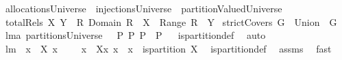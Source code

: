\begin{isabellebody}
\isamarkupfalse%
\ {\isachardoublequoteopen}allocationsUniverse\ {\isacharequal}{\isacharequal}\ injectionsUniverse\ {\isasyminter}\ partitionValuedUniverse{\isachardoublequoteclose}\isanewline
{}\isamarkupfalse%
\ {\isachardoublequoteopen}totalRels\ X\ Y\ {\isacharequal}{\isacharequal}\ {\isacharbraceleft}R{\isachardot}\ Domain\ R\ {\isacharequal}\ X\ {\isacharampersand}\ Range\ R\ {\isasymsubseteq}\ Y{\isacharbraceright}{\isachardoublequoteclose}\isanewline
{}\isamarkupfalse%
\ {\isachardoublequoteopen}strictCovers\ G\ {\isacharequal}{\isacharequal}\ Union\ {\isacharminus}{\isacharbackquote}\ {\isacharbraceleft}G{\isacharbraceright}{\isachardoublequoteclose}%
\isamarkuptrue%
\isamarkupfalse%
\ lm{}{}a{\isacharcolon}\ {\isachardoublequoteopen}partitionsUniverse\ {\isasymsubseteq}\ \ {\isacharbraceleft}P{\isacharminus}{\isacharbraceleft}{\isacharbraceleft}{\isacharbraceright}{\isacharbraceright}{\isacharbar}\ P{\isachardot}\ {\isasymInter}P\ {\isasymin}\ {\isacharbraceleft}{\isasymUnion}P{\isacharcomma}{\isacharbraceleft}{\isacharbraceright}{\isacharbraceright}{\isacharbraceright}{\isachardoublequoteclose}%
\isadelimproof
\ %
\endisadelimproof
%
\isatagproof
{}\isamarkupfalse%
\ is{\isacharunderscore}partition{\isacharunderscore}def\ \isamarkupfalse%
\ auto%
\endisatagproof
{\isafoldproof}%
%
\isadelimproof
%
\endisadelimproof
\isanewline
{}\isamarkupfalse%
\ lm{}{}{\isacharcolon}\ \ {\isachardoublequoteopen}{\isacharbang}x{}\ {\isacharcolon}\ X{\isachardot}\ {\isacharparenleft}x{}\ {\isasymnoteq}\ {\isacharbraceleft}{\isacharbraceright}\ {\isacharampersand}\ {\isacharparenleft}{\isacharbang}\ x{}\ {\isacharcolon}\ X{\isacharminus}{\isacharbraceleft}x{}{\isacharbraceright}{\isachardot}\ x{}\ {\isasyminter}\ x{}{\isacharequal}{\isacharbraceleft}{\isacharbraceright}{\isacharparenright}{\isacharparenright}{\isachardoublequoteclose}\ \ {\isachardoublequoteopen}is{\isacharunderscore}partition\ X{\isachardoublequoteclose}\ \isanewline
%
\isadelimproof
%
\endisadelimproof
%
\isatagproof
{}\isamarkupfalse%
\ is{\isacharunderscore}partition{\isacharunderscore}def\ \isamarkupfalse%
\ assms\ \isamarkupfalse%
\ fast%
\endisatagproof
{\isafoldproof}%

\end{isabellebody}
